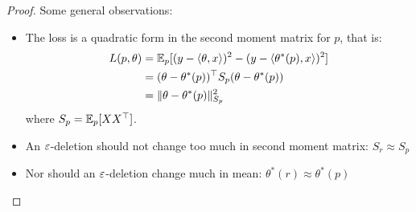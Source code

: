 \begin{proof}
  Some general observations:
  \begin{itemize}
    \item The loss is a quadratic form in the second moment matrix for $p$, that is:
      \begin{align}
      L(p, \theta)
      &= \mathbb{E}_p[(y - \braket{\theta, x})^2 - (y - \braket{\theta^*(p), x})^2] \\
      &= (\theta - \theta^*(p))^\top S_p (\theta - \theta^*(p)) \\
      &= \|\theta - \theta^*(p)\|_{S_p}^2
      \end{align}
      where $S_p = \mathbb{E}_p[X X^\top]$.
    \item An $\varepsilon$-deletion should not change too much in second moment matrix:
      $S_r \approx S_p$
    \item Nor should an $\varepsilon$-deletion change much in mean: $\theta^*(r) \approx \theta^*(p)$
  \end{itemize}


\end{proof}
